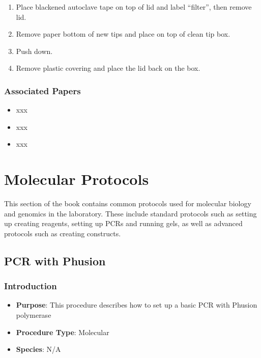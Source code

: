 \documentclass[
  letterpaper,
  DIV=11,
  numbers=noendperiod]{scrreprt}
\providecommand{\tightlist}{%
  \setlength{\itemsep}{0pt}\setlength{\parskip}{0pt}}\usepackage{longtable,booktabs,array}
\begin{document}
\begin{enumerate}
\begin{itemize}
    \begin{enumerate}
    \def\labelenumii{\arabic{enumii}.}
    \tightlist
    \item
      Place blackened autoclave tape on top of lid and label ``filter'',
      then remove lid.
    \item
      Remove paper bottom of new tips and place on top of clean tip box.
    \item
      Push down.
    \item
      Remove plastic covering and place the lid back on the box.
    \end{enumerate}
  \end{itemize}
\end{enumerate}

\hypertarget{associated-papers-8}{%
\section{Associated Papers}\label{associated-papers-8}}

\begin{itemize}
\tightlist
\item
  xxx
\item
  xxx
\item
  xxx
\end{itemize}

\part{Molecular Protocols}

This section of the book contains common protocols used for molecular
biology and genomics in the laboratory. These include standard protocols
such as setting up creating reagents, setting up PCRs and running gels,
as well as advanced protocols such as creating constructs.

\hypertarget{sec-molecular-Phusion_PCR}{%
\chapter{PCR with Phusion}\label{sec-molecular-Phusion_PCR}}

\hypertarget{introduction-9}{%
\section{Introduction}\label{introduction-9}}

\begin{itemize}
\tightlist
\item
  \textbf{Purpose}: This procedure describes how to set up a basic PCR
  with Phusion polymerase
\item
  \textbf{Procedure Type}: Molecular
\item
  \textbf{Species}: N/A
\end{itemize}
\end{document}
